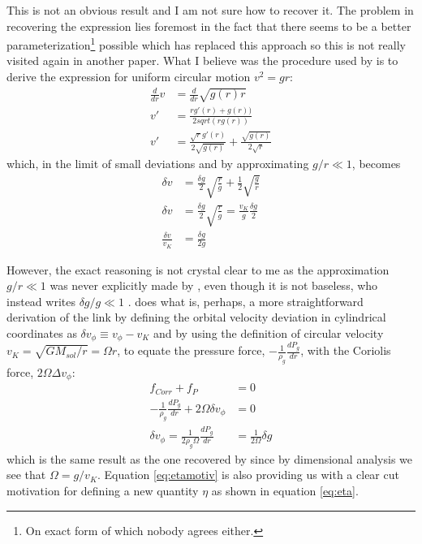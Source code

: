 \documentclass[12pt]{article}
\begin{document}
This is not an obvious result and I am not sure how to recover it. The problem in recovering the expression lies foremost in the fact that there seems to be a better parameterization\footnote{On exact form of which nobody agrees either.} possible which has replaced this approach so this is not really visited again in another paper. What I believe was the procedure used by \citet{Weidenschilling77} is to derive the expression for uniform circular motion $v^2 = gr$:
\begin{align}
    \frac{d}{dr}v &= \frac{d}{dr}\sqrt{g(r)r} \\
    v' &= \frac{r g'(r) + g(r))}{2 sqrt(r g(r))} \\
    v' &= \frac{\sqrt{r} g'(r)}{2 \sqrt{g(r)}} + \frac{\sqrt{g(r)}}{2 \sqrt{r}} 
\end{align}
which, in the limit of small deviations and by approximating $g/r \ll 1$, becomes
\begin{align}
    \delta v &= \frac{\delta g}{2}\sqrt{\frac{r}{g}} + \frac{1}{2} \sqrt{\frac{g}{r}} \\
    \delta v &= \frac{\delta g}{2} \sqrt{\frac{r}{g}} = \frac{v_K}{g}\frac{\delta g}{2} \\
    \frac{\delta v }{v_K} &= \frac{\delta g}{2 g}
\end{align}

However, the exact reasoning is not crystal clear to me as the approximation $g/r \ll 1$ was never explicitly made by \citet{Weidenschilling77}, even though it is not baseless, who instead writes $\delta g/g \ll 1$ . \citet{LesHouches} does what is, perhaps, a more straightforward derivation of the link by defining the orbital velocity deviation in cylindrical coordinates as $\delta v_\phi \equiv v_\phi - v_K$ and by using the definition of circular velocity $v_K = \sqrt{GM_{sol}/r} = \Omega r$, to equate the pressure force, $-\frac{1}{\rho_g}\frac{dP_g}{dr}$, with the Coriolis force, $2\Omega\Delta v_\phi$:
\begin{align}
    \label{eq:simpledvdg}
    f_{Corr} + f_P &= 0 \\
    -\frac{1}{\rho_g}\frac{dP_g}{dr} + 2\Omega\delta v_\phi &= 0 \\
    \label{eq:etamotiv}
    \delta v_\phi = \frac{1}{2\rho_g\Omega}\frac{dP_g}{dr} &= \frac{1}{2\Omega}\delta g
\end{align}
which is the same result as the one recovered by \citet{Weidenschilling77} since by dimensional analysis we see that $\Omega = g/v_K$. Equation \ref{eq:etamotiv} is also providing us with a clear cut motivation for defining a new quantity $\eta$ as shown in equation \ref{eq:eta}.
\end{document}

